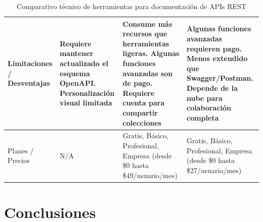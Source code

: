 \documentclass[man, floatsintext]{apa7}
\begin{document}
\begin{table}[h!]
\begin{tabular}{|p{4cm}|p{4cm}|p{4cm}|p{4cm}|}
			\hline
			Limitaciones / Desventajas & Requiere mantener actualizado el esquema OpenAPI. Personalización visual limitada & Consume más recursos que herramientas ligeras. Algunas funciones avanzadas son de pago. Requiere cuenta para compartir colecciones & Algunas funciones avanzadas requieren pago. Menos extendido que Swagger/Postman. Depende de la nube para colaboración completa \\
			\hline
			Planes / Precios & N/A & Gratis, Básico, Profesional, Empresa (desde \$0 hasta \$49/usuario/mes) & Gratis, Básico, Profesional, Empresa (desde \$0 hasta \$27/usuario/mes) \\
			\hline
		\end{tabular}
		\caption{Comparativo técnico de herramientas para documentación de APIs REST}
	\end{table}
	\FloatBarrier
	
	\section{Conclusiones}
	\printbibliography
\end{document}
